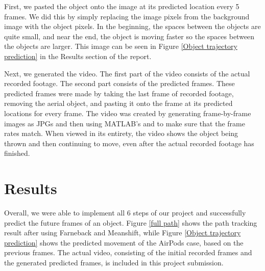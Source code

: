 \documentclass[12pt]{article}
\begin{document}
First, we pasted the object onto the image at its predicted location every 5 frames. We did this by simply replacing the image pixels from the background image with the object pixels. In the beginning, the spaces between the objects are quite small, and near the end, the object is moving faster so the spaces between the objects are larger. This image can be seen in Figure \ref{Object trajectory prediction} in the Results section of the report.

Next, we generated the video. The first part of the video consists of the actual recorded footage. The second part consists of the predicted frames. These predicted frames were made by taking the last frame of recorded footage, removing the aerial object, and pasting it onto the frame at its predicted locations for every frame. The video was created by generating frame-by-frame images as JPGs and then using MATLAB's  and  to make sure that the frame rates match. When viewed in its entirety, the video shows the object being thrown and then continuing to move, even after the actual recorded footage has finished.



\section*{Results}

Overall, we were able to implement all 6 steps of our project and successfully predict the future frames of an object. Figure \ref{full path} shows the path tracking result after using Farneback and Meanshift, while Figure \ref{Object trajectory prediction} shows the predicted movement of the AirPods case, based on the previous frames. The actual video, consisting of the initial recorded frames and the generated predicted frames, is included in this project submission.
\end{document}
